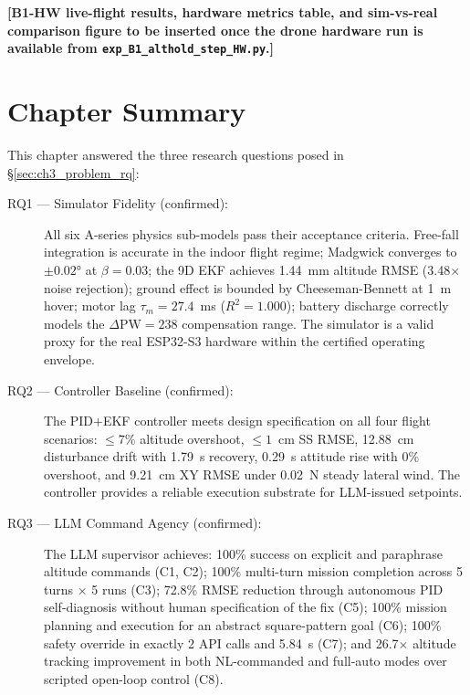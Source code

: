 \textbf{[B1-HW live-flight results, hardware metrics table, and sim-vs-real
comparison figure to be inserted once the drone hardware run is
available from \texttt{exp\_B1\_althold\_step\_HW.py}.]}


\section{Chapter Summary}
\label{sec:ch3_summary}

This chapter answered the three research questions posed in
\S\ref{sec:ch3_problem_rq}:

\begin{description}
  \item[RQ1 --- Simulator Fidelity (confirmed):]
    All six A-series physics sub-models pass their acceptance criteria.
    Free-fall integration is accurate in the indoor flight regime; Madgwick
    converges to $\pm 0.02°$ at $\beta = 0.03$; the 9D EKF achieves
    1.44~mm altitude RMSE (3.48$\times$ noise rejection); ground effect
    is bounded by Cheeseman-Bennett at 1~m hover; motor lag $\tau_m = 27.4$~ms
    ($R^2 = 1.000$); battery discharge correctly models the $\Delta\text{PW}=238$
    compensation range. The simulator is a valid proxy for the real ESP32-S3
    hardware within the certified operating envelope.

  \item[RQ2 --- Controller Baseline (confirmed):]
    The PID+EKF controller meets design specification on all four flight
    scenarios: $\leq 7\%$ altitude overshoot, $\leq 1$~cm SS RMSE,
    12.88~cm disturbance drift with 1.79~s recovery, 0.29~s attitude rise
    with 0\% overshoot, and 9.21~cm XY RMSE under 0.02~N steady lateral wind.
    The controller provides a reliable execution substrate for LLM-issued
    setpoints.

  \item[RQ3 --- LLM Command Agency (confirmed):]
    The LLM supervisor achieves: 100\% success on explicit and paraphrase
    altitude commands (C1, C2); 100\% multi-turn mission completion across
    5 turns $\times$ 5 runs (C3); 72.8\% RMSE reduction through autonomous
    PID self-diagnosis without human specification of the fix (C5); 100\%
    mission planning and execution for an abstract square-pattern goal (C6);
    100\% safety override in exactly 2 API calls and 5.84~s (C7); and
    26.7$\times$ altitude tracking improvement in both NL-commanded and
    full-auto modes over scripted open-loop control (C8).
\end{description}

